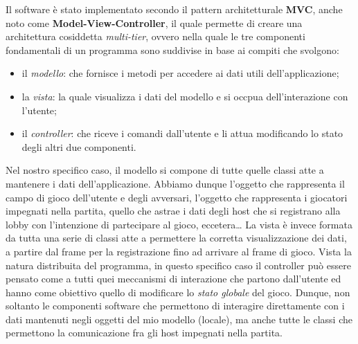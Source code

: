 Il software è stato implementato secondo il pattern architetturale \textbf{MVC},
anche noto come \textbf{Model-View-Controller}, il quale permette di creare una
architettura cosiddetta \textit{multi-tier}, ovvero nella quale le tre
componenti fondamentali di un programma sono suddivise in base ai compiti che
svolgono:
\begin{itemize}
	\item il \textit{modello}: che fornisce i metodi per accedere ai dati utili
	dell'applicazione;
	\item la \textit{vista}: la quale visualizza i dati del modello e si occpua
	dell'interazione con l'utente;
	\item il \textit{controller}: che riceve i comandi dall'utente e li attua
	modificando lo stato degli altri due componenti.
\end{itemize}
Nel nostro specifico caso, il modello si compone di tutte quelle classi atte a
mantenere i dati dell'applicazione. Abbiamo dunque l'oggetto che rappresenta il
campo di gioco dell'utente e degli avversari, l'oggetto che rappresenta i
giocatori impegnati nella partita, quello che astrae i dati degli host che si
registrano alla lobby con l'intenzione di partecipare al gioco,
eccetera\dots\newline
La vista è invece formata da tutta una serie di classi atte a permettere la
corretta visualizzazione dei dati, a partire dal frame per la registrazione fino
ad arrivare al frame di gioco.\newline
Vista la natura distribuita del programma, in questo specifico caso il
controller può essere pensato come a tutti quei meccanismi di interazione che
partono dall'utente ed hanno come obiettivo quello di modificare lo
\textit{stato globale} del gioco. Dunque, non soltanto le componenti software
che permettono di interagire direttamente con i dati mantenuti negli oggetti
del mio modello (locale), ma anche tutte le classi che permettono la
comunicazione fra gli host impegnati nella partita.
